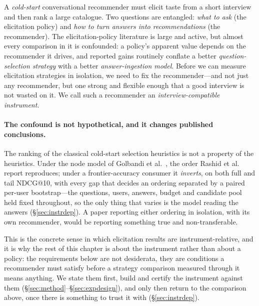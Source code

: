 \documentclass[11pt]{article}
\begin{document}
A \emph{cold-start} conversational recommender must elicit taste from a short interview and then rank a large
catalogue. Two questions are entangled: \emph{what to ask} (the elicitation policy) and \emph{how to turn answers
into recommendations} (the recommender). The elicitation-policy literature is large and active, but almost every
comparison in it is confounded: a policy's apparent value depends on the recommender it drives, and reported gains
routinely conflate a better \emph{question-selection strategy} with a better \emph{answer-ingestion model}. Before we
can measure elicitation strategies in isolation, we need to fix the recommender---and not just any recommender, but one
strong and flexible enough that a good interview is not wasted on it. We call such a recommender an
\emph{interview-compatible instrument}.

\paragraph{The confound is not hypothetical, and it changes published conclusions.}
The ranking of the classical cold-start selection heuristics is not a property of the heuristics. Under the node
model of Golbandi et al.~\cite{golbandi2011adaptive}, the order Rashid et al.~\cite{rashid2008learning} report
reproduces; under a frontier-accuracy consumer it \emph{inverts}, on both full and tail NDCG@10, with every gap
that decides an ordering separated by a paired per-user bootstrap---the questions, users, answers, budget and
candidate pool held fixed throughout, so the only thing that varies is the model reading the answers
(\S\ref{sec:instrdep}). A paper reporting either ordering in isolation, with its own recommender, would be
reporting something true and non-transferable.

This is the concrete sense in which elicitation results are instrument-relative, and it is why the rest of this
chapter is about the instrument rather than about a policy: the requirements below are not desiderata, they are
conditions a recommender must satisfy before a strategy comparison measured through it means anything. We state them
first, build and certify the instrument against them (\S\ref{sec:method}--\S\ref{sec:expdesign}), and only then
return to the comparison above, once there is something to trust it with (\S\ref{sec:instrdep}).
\end{document}
